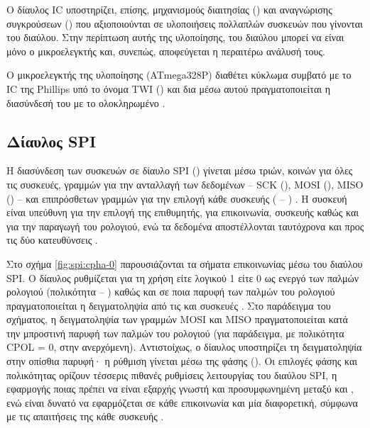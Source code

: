 Ο δίαυλος IC υποστηρίζει, επίσης, μηχανισμούς διαιτησίας
() και αναγνώρισης συγκρούσεων () που
αξιοποιούνται σε υλοποιήσεις πολλαπλών συσκευών που γίνονται  του
διαύλου. Στην περίπτωση αυτής της υλοποίησης,  του διαύλου μπορεί να
είναι μόνο ο μικροελεγκτής και, συνεπώς, αποφεύγεται η περαιτέρω ανάλυσή τους.



Ο μικροελεγκτής της υλοποίησης (ATmega328P) διαθέτει κύκλωμα συμβατό με το
IC της Phillips υπό το όνομα TWI () και δια μέσω
αυτού πραγματοποιείται η διασύνδεσή του με το ολοκληρωμένο
\parencite[209]{atmel13}.

\subsection{Δίαυλος SPI}
\label{subsec:spi}

Η διασύνδεση των συσκευών σε δίαυλο SPI ()
γίνεται μέσω τριών, κοινών για όλες τις συσκευές, γραμμών για την ανταλλαγή των
δεδομένων -- SCK (), MOSI (), MISO
() -- και επιπρόσθετων γραμμών για την επιλογή κάθε
 συσκευής ( -- )
\parencite[15,24]{motorola04}. Η  συσκευή είναι υπεύθυνη για την
επιλογή της επιθυμητής, για επικοινωνία,  συσκευής καθώς και για την
παραγωγή του ρολογιού, ενώ τα δεδομένα αποστέλλονται ταυτόχρονα και προς τις δύο
κατευθύνσεις \parencite[26--27]{motorola04}.

Στο σχήμα \ref{fig:spi:cpha-0} παρουσιάζονται τα σήματα επικοινωνίας μέσω του
διαύλου SPI. Ο δίαυλος ρυθμίζεται για τη χρήση είτε λογικού 1 είτε 0 ως ενεργό
 των παλμών ρολογιού (πολικότητα -- ) καθώς και σε ποια
παρυφή των παλμών του ρολογιού πραγματοποιείται η δειγματοληψία από τις
 και  συσκευές \parencite[27--28]{motorola04}. Στο
παράδειγμα του σχήματος, η δειγματοληψία των γραμμών MOSI και MISO
πραγματοποιείται κατά την μπροστινή παρυφή των παλμών του ρολογιού (για
παράδειγμα, με πολικότητα CPOL = 0, στην ανερχόμενη). Αντιστοίχως, ο δίαυλος
υποστηρίζει τη δειγματοληψία στην οπίσθια παρυφή· η ρύθμιση γίνεται μέσω της
φάσης (). Οι επιλογές φάσης και πολικότητας ορίζουν τέσσερις
πιθανές ρυθμίσεις λειτουργίας του διαύλου SPI, η εφαρμογής ποιας πρέπει να είναι
εξαρχής γνωστή και προσυμφωνημένη μεταξύ  και , ενώ είναι
δυνατό να εφαρμόζεται σε κάθε επικοινωνία και μία διαφορετική, σύμφωνα με τις
απαιτήσεις της κάθε συσκευής \parencites[27]{motorola04}[167]{atmel13}.


